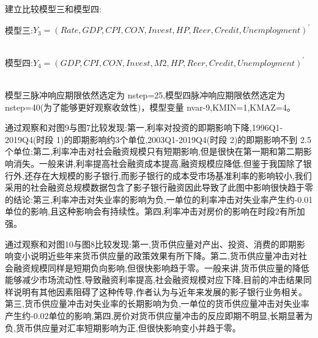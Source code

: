\documentclass{ijclclp}
\begin{document}
建立比较模型三和模型四:

模型三:$Y_3=(Rate,GDP,CPI, CON,Invest,HP, Reer, Credit, Unemployment)^'$

\\
模型四:$Y_4=(GDP, CPI, CON,Invest, M2,HP,Reer, Credit, Unemployment)^'$

\\
模型三脉冲响应期限依然选定为 nstep=25,模型四脉冲响应期限依然选定为nstep=40(为了能够更好观察收敛性)，模型变量 nvar-9,KMIN=1,KMAZ=4。

通过观察和对图9与图7比较发现:第一,利率对投资的即期影响下降,1996Q1-2019Q4(时段 1)的即期影响约3个单位,2003Q1-2019Q4(时段 2)的即期影响不到 2.5 个单位;第二,利率冲击对社会融资规模只有短期影响,但是很快在第一期和第二期影响消失。一般来讲,利率提高社会融资成本提高,融资规模应降低,但鉴于我国除了银行外,还存在大规模的影子银行,而影子银行的成本受市场基准利率的影响较小,我们采用的社会融资总规模数据包含了影子银行融资因此导致了此图中影响很快趋于零的结论:第三,利率冲击对失业率的影响为负,一单位的利率冲击对失业率产生约-0.01单位的影响,且这种影响会有持续性。第四,利率冲击对房价的影响在时段2有所加强。

通过观察和对图10与图8比较发现:第一,货币供应量对产出、投资、消费的即期影响变小说明近些年来货币供应量的政策效果有所下降。第二,货币供应量冲击对社会融资规模同样是短期负向影响,但很快影响趋于零。一般来讲,货币供应量的降低能够减少市场流动性,导致融资利率提高,社会融资规模对应下降,目前的冲击结果同样说明有其他因素阻碍了这种传导,作者认为与近年来发展的影子银行业务相关。第三,货币供应量冲击对失业率的长期影响为负,一单位的货币供应量冲击对失业率产生约-0.02单位的影响,第四,房价对货币供应量冲击的反应即期不明显,长期显著为负,货币供应量对汇率短期影响为正,但很快影响变小并趋于零。
\end{document}
